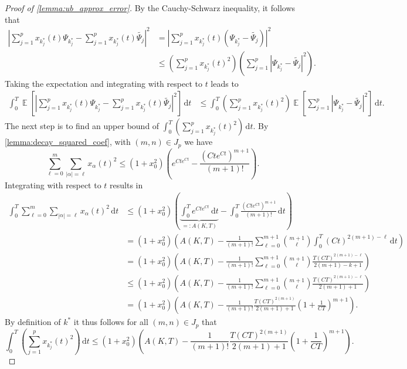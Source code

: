 \documentclass[12pt]{article}
\theoremstyle{remark}
\theoremstyle{plain}
\numberwithin{equation}{section}
\newcommand{\dd}{\ensuremath{\,\mathrm d}}
\DeclareMathOperator{\E}{\mathbb E}
\begin{document}
\begin{proof}[Proof of \cref{lemma:ub_approx_error}]
    By the Cauchy-Schwarz inequality, it follows that
    \begin{align*}
        \left|\sum_{j=1}^p x_{k_j^*}(t)\Psi_{k_j^*} - \sum_{j=1}^p x_{k_j^*}(t)\widetilde{\Psi_j}\right|^2 &= \left|\sum_{j=1}^p x_{k_j^*}(t)(\Psi_{k_j^*}-\widetilde{\Psi_j})\right|^2\\
        &\leq \left(\sum_{j=1}^p x_{k_j^*}(t)^2\right)\left(\sum_{j=1}^p |\Psi_{k_j^*}-\widetilde{\Psi_j}|^2\right).
    \end{align*}
    Taking the expectation and integrating with respect to $t$ leads to
    \begin{align*}
        \int_0^T \E\left[\left|\sum_{j=1}^p x_{k_j^*}(t)\Psi_{k_j^*} - \sum_{j=1}^p x_{k_j^*}(t)\widetilde{\Psi_j}\right|^2\right]\dd t &\leq \int_0^T \left(\sum_{j=1}^p x_{k_j^*}(t)^2\right)\E\left[\sum_{j=1}^p |\Psi_{k_j^*}-\widetilde{\Psi_j}|^2\right]\dd t.
    \end{align*}
    The next step is to find an upper bound of $\int_0^T \left(\sum_{j=1}^p x_{k_j^*}(t)^2\right) \dd t$.
    By \cref{lemma:decay_squared_coef}, with $(m,n) \in J_p$ we have
    \begin{equation*}
        \sum_{\ell = 0}^m \sum_{|\alpha|=\ell} x_\alpha(t)^2 \leq (1+x_0^2)\left(e^{Ct e^{Ct}} - \frac{(Cte^{Ct})^{m+1}}{(m+1)!}\right).
    \end{equation*}
    Integrating with respect to $t$ results in
    \begin{align*}
        \int_0^T \sum_{\ell=0}^m\sum_{|\alpha|=\ell}x_\alpha(t)^2 \dd t &\leq (1+x_0^2)\left(\underbrace{\int_0^T e^{Cte^{Ct}} \dd t}_{=: A(K,T)} - \int_0^T \frac{(Cte^{Ct})^{m+1}}{(m+1)!}\dd t\right)\\
        &= (1+x_0^2)\left(A(K,T) - \frac{1}{(m+1)!}\sum_{\ell=0}^{m+1}\binom{m+1}{\ell}\int_0^T (Ct)^{2(m+1)-\ell}\dd t\right)\\
        &= (1+x_0^2)\left(A(K,T) - \frac{1}{(m+1)!}\sum_{\ell=0}^{m+1}\binom{m+1}{\ell}\frac{T(CT)^{2(m+1)-\ell}}{2(m+1)-k+1}\right)\\
        &\leq (1+x_0^2)\left(A(K,T) - \frac{1}{(m+1)!}\sum_{\ell=0}^{m+1}\binom{m+1}{\ell}\frac{T(CT)^{2(m+1)-\ell}}{2(m+1)+1}\right)\\
        &= (1+x_0^2)\left(A(K,T) - \frac{1}{(m+1)!}\frac{T(CT)^{2(m+1)}}{2(m+1)+1}\left(1+\frac{1}{CT}\right)^{m+1}\right).
    \end{align*}
    By definition of $k^*$ it thus follows for all $(m,n) \in J_p$ that
    \begin{equation*}
        \int_0^T \left(\sum_{j=1}^p x_{k_j^*}(t)^2\right) \dd t \leq (1+x_0^2)\left(A(K,T) - \frac{1}{(m+1)!}\frac{T(CT)^{2(m+1)}}{2(m+1)+1}\left(1+\frac{1}{CT}\right)^{m+1}\right).
    \end{equation*}


\end{proof}
\end{document}
